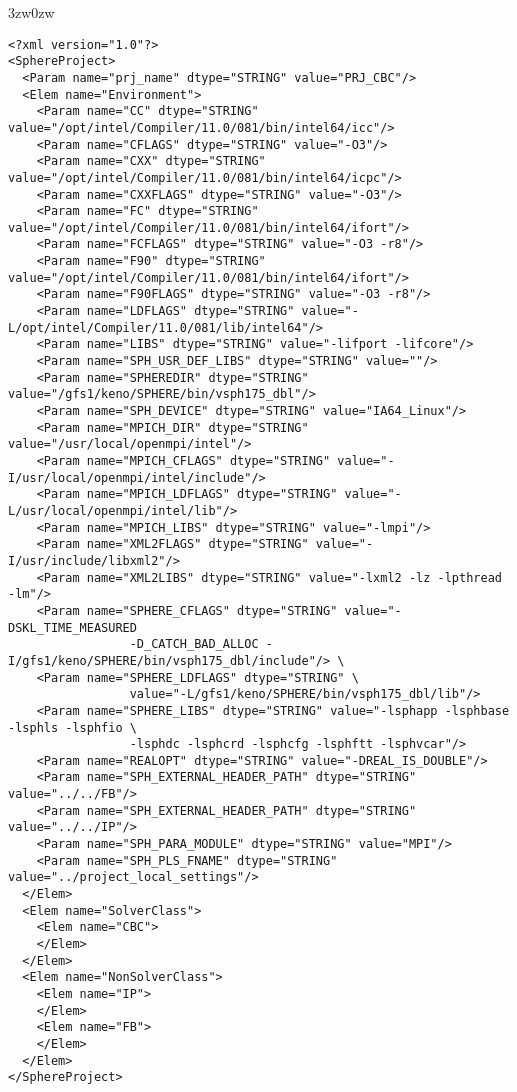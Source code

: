 \begin{indentation}{3zw}{0zw}
\small
\begin{verbatim}
<?xml version="1.0"?>
<SphereProject>
  <Param name="prj_name" dtype="STRING" value="PRJ_CBC"/>
  <Elem name="Environment">
    <Param name="CC" dtype="STRING" value="/opt/intel/Compiler/11.0/081/bin/intel64/icc"/>
    <Param name="CFLAGS" dtype="STRING" value="-O3"/>
    <Param name="CXX" dtype="STRING" value="/opt/intel/Compiler/11.0/081/bin/intel64/icpc"/>
    <Param name="CXXFLAGS" dtype="STRING" value="-O3"/>
    <Param name="FC" dtype="STRING" value="/opt/intel/Compiler/11.0/081/bin/intel64/ifort"/>
    <Param name="FCFLAGS" dtype="STRING" value="-O3 -r8"/>
    <Param name="F90" dtype="STRING" value="/opt/intel/Compiler/11.0/081/bin/intel64/ifort"/>
    <Param name="F90FLAGS" dtype="STRING" value="-O3 -r8"/>
    <Param name="LDFLAGS" dtype="STRING" value="-L/opt/intel/Compiler/11.0/081/lib/intel64"/>
    <Param name="LIBS" dtype="STRING" value="-lifport -lifcore"/>
    <Param name="SPH_USR_DEF_LIBS" dtype="STRING" value=""/>
    <Param name="SPHEREDIR" dtype="STRING" value="/gfs1/keno/SPHERE/bin/vsph175_dbl"/>
    <Param name="SPH_DEVICE" dtype="STRING" value="IA64_Linux"/>
    <Param name="MPICH_DIR" dtype="STRING" value="/usr/local/openmpi/intel"/>
    <Param name="MPICH_CFLAGS" dtype="STRING" value="-I/usr/local/openmpi/intel/include"/>
    <Param name="MPICH_LDFLAGS" dtype="STRING" value="-L/usr/local/openmpi/intel/lib"/>
    <Param name="MPICH_LIBS" dtype="STRING" value="-lmpi"/>
    <Param name="XML2FLAGS" dtype="STRING" value="-I/usr/include/libxml2"/>
    <Param name="XML2LIBS" dtype="STRING" value="-lxml2 -lz -lpthread -lm"/>
    <Param name="SPHERE_CFLAGS" dtype="STRING" value="-DSKL_TIME_MEASURED 
                 -D_CATCH_BAD_ALLOC -I/gfs1/keno/SPHERE/bin/vsph175_dbl/include"/> \
    <Param name="SPHERE_LDFLAGS" dtype="STRING" \
                 value="-L/gfs1/keno/SPHERE/bin/vsph175_dbl/lib"/>
    <Param name="SPHERE_LIBS" dtype="STRING" value="-lsphapp -lsphbase -lsphls -lsphfio \
                 -lsphdc -lsphcrd -lsphcfg -lsphftt -lsphvcar"/>
    <Param name="REALOPT" dtype="STRING" value="-DREAL_IS_DOUBLE"/>
    <Param name="SPH_EXTERNAL_HEADER_PATH" dtype="STRING" value="../../FB"/>
    <Param name="SPH_EXTERNAL_HEADER_PATH" dtype="STRING" value="../../IP"/>
    <Param name="SPH_PARA_MODULE" dtype="STRING" value="MPI"/>
    <Param name="SPH_PLS_FNAME" dtype="STRING" value="../project_local_settings"/>
  </Elem>
  <Elem name="SolverClass">
    <Elem name="CBC">
    </Elem>
  </Elem>
  <Elem name="NonSolverClass">
    <Elem name="IP">
    </Elem>
    <Elem name="FB">
    </Elem>
  </Elem>
</SphereProject>
\end{verbatim}
\end{indentation}

